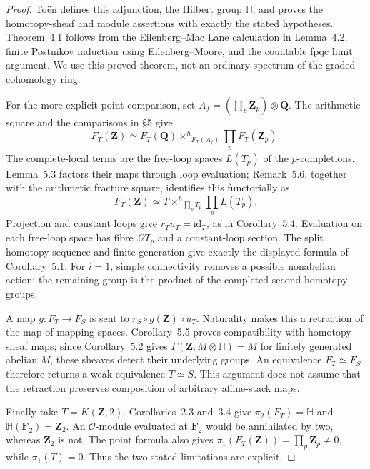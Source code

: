 \begin{proof}
To\"en \cite[\S1, Definition~2.1, Theorem~4.1 and Corollary~4.4]{BToen2020}
defines this adjunction, the Hilbert group $\mathbb H$, and proves the
homotopy-sheaf and module assertions with exactly the stated hypotheses.
Theorem~4.1 follows from the Eilenberg--Mac Lane calculation in Lemma~4.2,
finite Postnikov induction using Eilenberg--Moore, and the countable fpqc
limit argument. We use this proved theorem, not an ordinary spectrum of
the graded cohomology ring.

For the more explicit point comparison, set
$A_f=(\prod_p\mathbf Z_p)\otimes\mathbf Q$.
The arithmetic square and the comparisons in \S5 give
\[
 F_T(\mathbf Z)\simeq
 F_T(\mathbf Q)\mathbin{\times^h}_{F_T(A_f)}\prod_pF_T(\mathbf Z_p).
\]
The complete-local terms are the free-loop spaces $L(T_p)$ of the
$p$-completions. Lemma~5.3 factors their maps through loop evaluation;
Remark~5.6, together with the arithmetic fracture square, identifies
this functorially as
\[
 F_T(\mathbf Z)\simeq
 T\mathbin{\times^h}_{\prod_pT_p}\prod_pL(T_p).
\]
Projection and constant loops give $r_Tu_T=\mathrm{id}_T$, as in
Corollary~5.4. Evaluation on each free-loop space has fibre $\Omega T_p$
and a constant-loop section. The split homotopy sequence and finite
generation give exactly the displayed formula of Corollary~5.1.
For $i=1$, simple connectivity removes a possible nonabelian action:
the remaining group is the product of the completed second homotopy
groups.

A map $g:F_T\to F_S$ is sent to $r_S\circ g(\mathbf Z)\circ u_T$.
Naturality makes this a retraction of the map of mapping spaces.
Corollary~5.5 proves compatibility with homotopy-sheaf maps; since
Corollary~5.2 gives $\Gamma(\mathbf Z,M\otimes\mathbb H)=M$ for finitely
generated abelian $M$, these sheaves detect their underlying groups.
An equivalence $F_T\simeq F_S$ therefore returns a weak equivalence
$T\simeq S$. This argument does not assume that the retraction preserves
composition of arbitrary affine-stack maps.

Finally take $T=K(\mathbf Z,2)$. Corollaries~2.3 and~3.4 give
$\pi_2(F_T)=\mathbb H$ and $\mathbb H(\mathbf F_2)=\mathbf Z_2$.
An $\mathcal O$-module evaluated at $\mathbf F_2$ would be annihilated
by two, whereas $\mathbf Z_2$ is not. The point formula also gives
$\pi_1(F_T(\mathbf Z))=\prod_p\mathbf Z_p\ne0$, while $\pi_1(T)=0$.
Thus the two stated limitations are explicit.
\end{proof}

